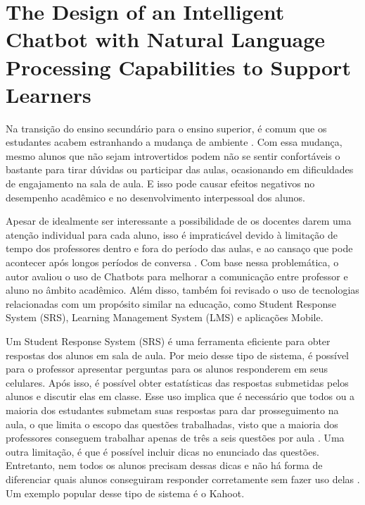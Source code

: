 \section{The Design of an Intelligent Chatbot with Natural Language Processing Capabilities to Support Learners \cite{wong2022}}
\label{sec:wong2022}

Na transição do ensino secundário para o ensino superior, é comum que os estudantes acabem estranhando a mudança de ambiente . Com essa mudança, mesmo alunos que não sejam introvertidos podem não se sentir confortáveis o bastante para tirar dúvidas ou participar das aulas, ocasionando em dificuldades de engajamento na sala de aula. E isso pode causar efeitos negativos no desempenho acadêmico e no desenvolvimento interpessoal dos alunos. 

Apesar de idealmente ser interessante a possibilidade de os docentes darem uma atenção individual para cada aluno, isso é impraticável devido à limitação de tempo dos professores dentro e fora do período das aulas, e ao cansaço que pode acontecer após longos períodos de conversa . Com base nessa problemática, o autor avaliou o uso de Chatbots para melhorar a comunicação entre professor e aluno no âmbito acadêmico. Além disso, também foi revisado o uso de tecnologias relacionadas com um propósito similar na educação, como Student Response System (SRS), Learning Management System (LMS) e aplicações Mobile.

Um Student Response System (SRS) é uma ferramenta eficiente para obter respostas dos alunos em sala de aula. Por meio desse tipo de sistema, é possível para o professor apresentar perguntas para os alunos responderem em seus celulares. Após isso, é possível obter estatísticas das respostas submetidas pelos alunos e discutir elas em classe. Esse uso implica que é necessário que todos ou a maioria dos estudantes submetam suas respostas para dar prosseguimento na aula, o que limita o escopo das questões trabalhadas, visto que a maioria dos professores conseguem trabalhar apenas de três a seis questões por aula . Uma outra limitação, é que é possível incluir dicas no enunciado das questões. Entretanto, nem todos os alunos precisam dessas dicas e não há forma de diferenciar quais alunos conseguiram responder corretamente sem fazer uso delas . Um exemplo popular desse tipo de sistema é o Kahoot.

